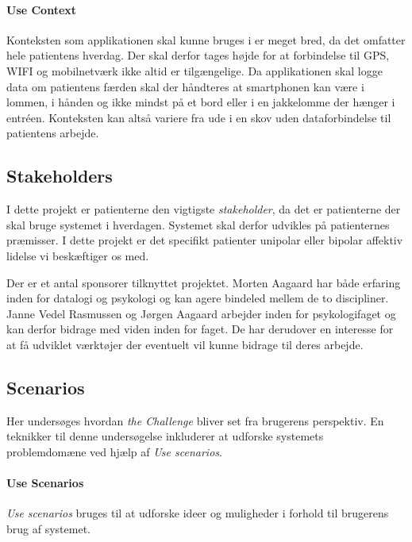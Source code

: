 \paragraph{Use Context}
Konteksten som applikationen skal kunne bruges i er meget bred, da det omfatter hele patientens hverdag.
Der skal derfor tages højde for at forbindelse til GPS, WIFI og mobilnetværk ikke altid er tilgængelige.
Da applikationen skal logge data om patientens færden skal der håndteres at smartphonen kan være i lommen, i hånden og ikke mindst på et bord eller i en jakkelomme der hænger i entréen.
Konteksten kan altså variere fra ude i en skov uden dataforbindelse til patientens arbejde.

\subsection{Stakeholders}
I dette projekt er patienterne den vigtigste \textit{stakeholder}, da det er patienterne der skal bruge systemet i hverdagen.
Systemet skal derfor udvikles på patienternes præmisser.
I dette projekt er det specifikt patienter unipolar eller bipolar affektiv lidelse vi beskæftiger os med.

Der er et antal sponsorer tilknyttet projektet.
Morten Aagaard har både erfaring inden for datalogi og psykologi og kan agere bindeled mellem de to discipliner.
Janne Vedel Rasmussen og Jørgen Aagaard arbejder inden for psykologifaget og kan derfor bidrage med viden inden for faget.
De har derudover en interesse for at få udviklet værktøjer der eventuelt vil kunne bidrage til deres arbejde.

\subsection{Scenarios}
Her undersøges hvordan \textit{the Challenge} bliver set fra brugerens perspektiv.
En teknikker til denne undersøgelse inkluderer at udforske systemets problemdomæne ved hjælp af \textit{Use scenarios}.

\paragraph{Use Scenarios}
\textit{Use scenarios} bruges til at udforske ideer og muligheder i forhold til brugerens brug af systemet.

